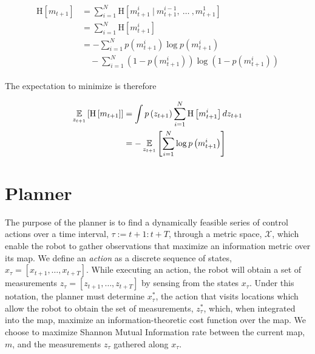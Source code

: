 \documentclass[conference]{IEEEtran}
\begin{document}
\begin{align} \begin{split}
  \text{H}\left[
    m_{t+1}
  \right]
  &=
  \sum_{i=1}^{N}
  \text{H}\left[
    m_{t+1}^{i}
    \ \vert \
    m_{t+1}^{i-1}
    , \
    \dots
    \ ,
    m_{t+1}^{1}
  \right]
  \\
  &=
  \sum_{i=1}^{N}
  \text{H}\left[
    m_{t+1}^{i}
  \right]
  \\
  &=
  -\sum_{i=1}^{N}
  p\left(m_{t+1}^{i}\right)
  \log p\left(m_{t+1}^{i}\right)
  \\
  &\quad
  -\sum_{i=1}^{N}
  \left( 1 - p\left(m_{t+1}^{i}\right) \right)
  \log \left( 1 - p\left(m_{t+1}^{i}\right) \right)
\end{split} \end{align}

The expectation to minimize is therefore

\begin{align} \begin{split}
  \expect_{z_{t+1}}\left[
    \text{H}\left[
      m_{t+1}
    \right]
  \right]
  &=
  \int
  p\left(
  z_{t+1}
  \right)
  \sum_{i=1}^{N}
  \text{H}\left[
    m_{t+1}^{i}
  \right]
  dz_{t+1}
  \\
  &=
  -\expect_{z_{t+1}}\left[
    \sum_{i=1}^{N}
    \log p\left(
    m_{t+1}^{i}
    \right)
  \right]
\end{split} \end{align}

\section{Planner}
The purpose of the planner is to find a dynamically feasible series of control actions over a time interval, $\tau := t+1 : t+T$, through a metric space, $\mathcal{X}$, which enable the robot to gather observations that maximize an information metric over its map. We define an \textit{action} as a discrete sequence of states, $x_{\tau} = \left[x_{t+1},\dots,x_{t+T}\right]$. While executing an action, the robot will obtain a set of measurements $z_{\tau} = \left[z_{t+1},\dots,z_{t+T}\right]$ by sensing from the states $x_{\tau}$. Under this notation, the planner must determine $x_{\tau}^{*}$, the action that visits locations which allow the robot to obtain the set of measurements, $z_{\tau}^{*}$, which, when integrated into the map, maximize an information-theoretic cost function over the map. We choose to maximize Shannon Mutual Information rate between the current map, $m$, and the measurements $z_{\tau}$ gathered along $x_{\tau}$.
\end{document}
